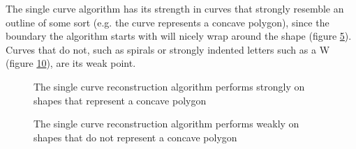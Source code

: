 \documentclass[11pt]{article}
\begin{document}
The single curve algorithm has its strength in curves that strongly resemble an outline of some sort (e.g. the curve represents a concave polygon), since the boundary the algorithm starts with will nicely wrap around the shape (figure \ref{fig:exp:single_parameter_e}). Curves that do not, such as spirals or strongly indented letters such as a W (figure \ref{fig:exp:single_parameter_f}), are its weak point.

\begingroup
{}%
\begin{figure}[ht!]
\centering
\begin{subfigure}{.3\linewidth}
\centering

\label{fig:exp:single_parameter_e:first}
\end{subfigure}%
\begin{subfigure}{.3\linewidth}
\centering

\label{fig:exp:single_parameter_e:second}
\centering
\end{subfigure}
\begin{subfigure}{.19\linewidth}
\centering

\label{fig:exp:single_parameter_e:third}
\end{subfigure}%
\begin{subfigure}{.19\linewidth}
\centering

\label{fig:exp:single_parameter_e:fourth}
\centering
\end{subfigure}
\caption{The single curve reconstruction algorithm performs strongly on shapes that represent a concave polygon}
\label{fig:exp:single_parameter_e}
\end{figure}
\endgroup

\begingroup
{}%
\begin{figure}[ht!]
\centering
\begin{subfigure}{.24\linewidth}
\centering

\label{fig:exp:single_parameter_f:first}
\end{subfigure}%
\begin{subfigure}{.24\linewidth}
\centering

\label{fig:exp:single_parameter_f:second}
\centering
\end{subfigure}
\begin{subfigure}{.24\linewidth}
\centering

\label{fig:exp:single_parameter_f:third}
\end{subfigure}%
\begin{subfigure}{.24\linewidth}
\centering

\label{fig:exp:single_parameter_f:fourth}
\centering
\end{subfigure}
\caption{The single curve reconstruction algorithm performs weakly on shapes that do not represent a concave polygon}
\label{fig:exp:single_parameter_f}
\end{figure}
\endgroup
\end{document}
